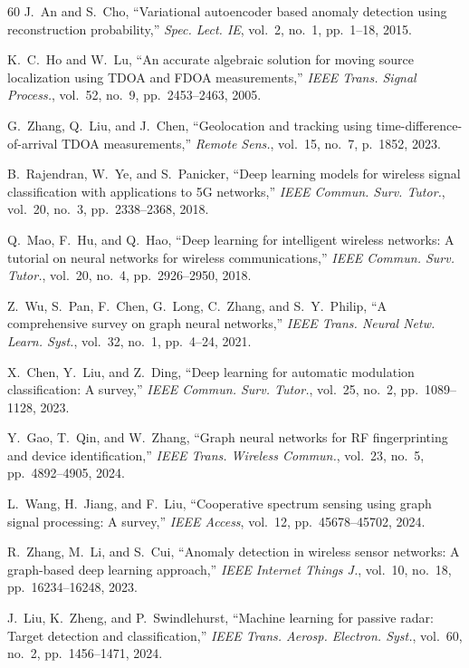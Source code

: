 \documentclass[sensors,article,submit,pdftex]{mdpi}
\begin{document}
\begin{thebibliography}{60}
J.~An and S.~Cho, ``Variational autoencoder based anomaly detection using reconstruction probability,'' \textit{Spec. Lect. IE}, vol.~2, no.~1, pp.~1--18, 2015.

K.~C.~Ho and W.~Lu, ``An accurate algebraic solution for moving source localization using TDOA and FDOA measurements,'' \textit{IEEE Trans. Signal Process.}, vol.~52, no.~9, pp.~2453--2463, 2005.

G.~Zhang, Q.~Liu, and J.~Chen, ``Geolocation and tracking using time-difference-of-arrival TDOA measurements,'' \textit{Remote Sens.}, vol.~15, no.~7, p.~1852, 2023.

B.~Rajendran, W.~Ye, and S.~Panicker, ``Deep learning models for wireless signal classification with applications to 5G networks,'' \textit{IEEE Commun. Surv. Tutor.}, vol.~20, no.~3, pp.~2338--2368, 2018.

Q.~Mao, F.~Hu, and Q.~Hao, ``Deep learning for intelligent wireless networks: A tutorial on neural networks for wireless communications,'' \textit{IEEE Commun. Surv. Tutor.}, vol.~20, no.~4, pp.~2926--2950, 2018.

Z.~Wu, S.~Pan, F.~Chen, G.~Long, C.~Zhang, and S.~Y.~Philip, ``A comprehensive survey on graph neural networks,'' \textit{IEEE Trans. Neural Netw. Learn. Syst.}, vol.~32, no.~1, pp.~4--24, 2021.

X.~Chen, Y.~Liu, and Z.~Ding, ``Deep learning for automatic modulation classification: A survey,'' \textit{IEEE Commun. Surv. Tutor.}, vol.~25, no.~2, pp.~1089--1128, 2023.

Y.~Gao, T.~Qin, and W.~Zhang, ``Graph neural networks for RF fingerprinting and device identification,'' \textit{IEEE Trans. Wireless Commun.}, vol.~23, no.~5, pp.~4892--4905, 2024.

L.~Wang, H.~Jiang, and F.~Liu, ``Cooperative spectrum sensing using graph signal processing: A survey,'' \textit{IEEE Access}, vol.~12, pp.~45678--45702, 2024.

R.~Zhang, M.~Li, and S.~Cui, ``Anomaly detection in wireless sensor networks: A graph-based deep learning approach,'' \textit{IEEE Internet Things J.}, vol.~10, no.~18, pp.~16234--16248, 2023.

J.~Liu, K.~Zheng, and P.~Swindlehurst, ``Machine learning for passive radar: Target detection and classification,'' \textit{IEEE Trans. Aerosp. Electron. Syst.}, vol.~60, no.~2, pp.~1456--1471, 2024.


\end{thebibliography}
\end{document}
